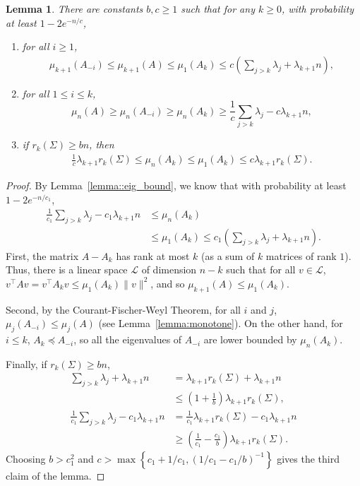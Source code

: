 \documentclass[11pt,notitlepage]{article}
\newcommand\Ls {\mathscr{L}}
\newtheorem{lemma}[theorem]{Lemma}
\begin{document}
\begin{lemma}\label{lemma::eigvals_of_truncated}
  There are constants $b,c\ge 1$ such that for any
$k\ge 0$, 
with probability at least $1 - 2e^{-n/c}$,
    \begin{enumerate}
      \item for all $i\ge 1$,
        \begin{align*}
       \mu_{k+1}(A_{-i}) \le \mu_{{k+1}}(A) \le \mu_1(A_k)
           \le c\left(\sum_{j>k}\lambda_j + \lambda_{k+1}n\right),
        \end{align*}
      \item for all $1\le i\le k$,
        \[
          \mu_n(A) \ge \mu_n(A_{-i}) \ge \mu_n\left(A_k\right)
          \ge \frac{1}{c}\sum_{j>k} \lambda_j - c\lambda_{k+1} n,
        \]
      \item if $r_k(\Sigma)\ge bn$, then
        \begin{align*}
          \frac{1}{c}\lambda_{k+1} r_k(\Sigma)
            \le \mu_n\left(A_k\right)
            \le \mu_1(A_k) \le c\lambda_{k+1} r_k(\Sigma).
    \end{align*}
    \end{enumerate}
\end{lemma}
\begin{proof}
  By Lemma~\ref{lemma::eig_bound}, we know that with probability at
  least 
$1-2e^{-n/c_1}$,
    \begin{align*}
      \frac{1}{c_1}\sum_{j>k}\lambda_j - c_1\lambda_{k+1} n
        & \leq \mu_n(A_k) \\
        & \leq \mu_1(A_k) 
        \leq c_1\left(\sum_{j>k} \lambda_j + \lambda_{k+1} n\right).
    \end{align*}
  First, the matrix $A - A_{k}$ has rank at most $k$
  (as a sum of $k$ matrices of rank $1$).
  Thus, there is a linear space $\Ls$ of dimension $n-k$ such that 
  for all $v\in\Ls$, $v^\top Av = v^\top A_k v \leq \mu_1(A_k)\|v\|^2$,
  and so $\mu_{k+1}(A) \le \mu_1(A_k)$.
  
  Second, by the Courant-Fischer-Weyl Theorem, for all $i$ and $j$,
  $\mu_j(A_{-i})\le \mu_j(A)$ (see Lemma~\ref{lemma:monotone}).
  On the other hand, for $i \leq k$, $A_k \preceq A_{-i}$, so all
  the eigenvalues of $ A_{-i}$ are lower bounded by $\mu_n(A_k)$.

  Finally, if $r_k(\Sigma)\ge b n$,
    \begin{align*}
      \sum_{j>k}\lambda_j + \lambda_{k+1}n
        & = \lambda_{k+1} r_k(\Sigma) + \lambda_{k+1}n \\
        & \le \left(1+\frac{1}{b}\right)\lambda_{k+1} r_k(\Sigma), \\
      \frac{1}{c_1}\sum_{j>k}\lambda_j - c_1\lambda_{k+1}n
        & = \frac{1}{c_1}\lambda_{k+1} r_k(\Sigma) - c_1\lambda_{k+1}n
        \\
        & \ge \left(\frac{1}{c_1}-\frac{c_1}{b}\right)
          \lambda_{k+1} r_k(\Sigma).
    \end{align*}
  Choosing $b > c_1^2$ and $c > \max\left\{c_1+1/c_1,
  \left(1/c_1-c_1/b\right)^{-1}\right\}$  gives the
  third
  claim of the lemma.
\end{proof}
\end{document}
